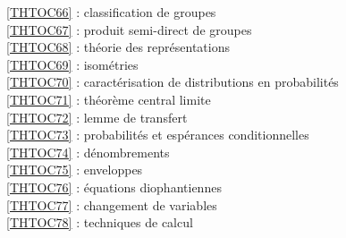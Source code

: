 \ref {THTOC66} : classification de groupes\\
\ref {THTOC67} : produit semi-direct de groupes\\
\ref {THTOC68} : théorie des représentations\\
\ref {THTOC69} : isométries\\
\ref {THTOC70} : caractérisation de distributions en probabilités\\
\ref {THTOC71} : théorème central limite\\
\ref {THTOC72} : lemme de transfert\\
\ref {THTOC73} : probabilités et espérances conditionnelles\\
\ref {THTOC74} : dénombrements\\
\ref {THTOC75} : enveloppes\\
\ref {THTOC76} : équations diophantiennes\\
\ref {THTOC77} : changement de variables\\
\ref {THTOC78} : techniques de calcul\\
